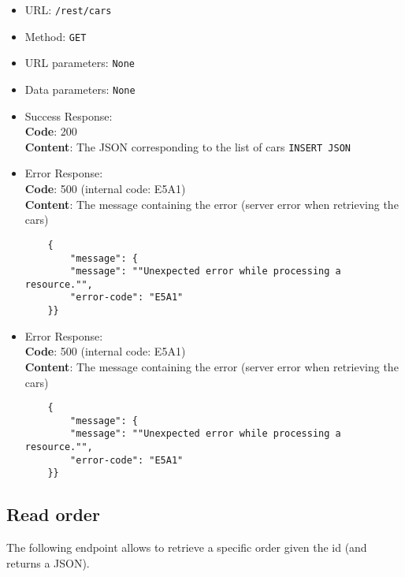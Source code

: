 \begin{itemize}
    \item URL: \texttt{/rest/cars}
    \item Method: \texttt{GET}
    \item URL parameters: \texttt{None}
    \item Data parameters: \texttt{None}
    \item Success Response: \\
    \textbf{Code}: 200\\
    \textbf{Content}: The JSON corresponding to the list of cars
    \texttt{INSERT JSON}
    \item Error Response:\\
    \textbf{Code}: 500 (internal code: E5A1)\\
    \textbf{Content}: The message containing the error (server error when retrieving the cars)\\
    \begin{verbatim}
    {
        "message": {
        "message": ""Unexpected error while processing a resource."",
        "error-code": "E5A1"
    }}
    \end{verbatim}
    \item Error Response:\\
    \textbf{Code}: 500 (internal code: E5A1)\\
    \textbf{Content}: The message containing the error (server error when retrieving the cars)\\
    \begin{verbatim}
    {
        "message": {
        "message": ""Unexpected error while processing a resource."",
        "error-code": "E5A1"
    }}
    \end{verbatim}

\end{itemize}

\subsection*{Read order}

The following endpoint allows to retrieve a specific order given the id (and returns a JSON).

